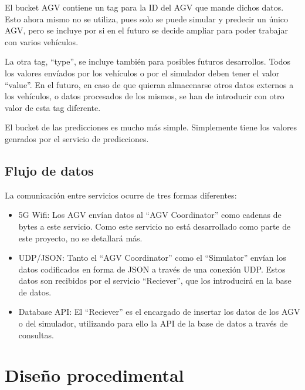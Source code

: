 El bucket AGV contiene un tag para la ID del AGV que mande dichos datos. Esto ahora mismo no se utiliza, pues 
solo se puede simular y predecir un único AGV, pero se incluye por si en el futuro se decide ampliar para poder 
trabajar con varios vehículos. 

La otra tag, ``type'', se incluye también para posibles futuros desarrollos. Todos los valores envíados por los 
vehículos o por el simulador deben tener el valor ``value''. En el futuro, en caso de que quieran almacenarse 
otros datos externos a los vehículos, o datos procesados de los mismos, se han de introducir con otro valor de 
esta tag diferente.


El bucket de las predicciones es mucho más simple. Simplemente tiene los valores genrados por el servicio de 
predicciones.

\subsection{Flujo de datos}

La comunicación entre servicios ocurre de tres formas diferentes:
\begin{itemize}
    \item 5G Wifi: Los AGV envían datos al ``AGV Coordinator'' como cadenas de bytes a este servicio.
        Como este servicio no está desarrollado como parte de este proyecto, no se detallará más.
    \item UDP/JSON: Tanto el ``AGV Coordinator'' como el ``Simulator'' envían los datos codificados en 
        forma de JSON a través de una conexión UDP. Estos datos son recibidos por el servicio ``Reciever'',
        que los introducirá en la base de datos.
    \item Database API: El ``Reciever'' es el encargado de insertar los datos de los AGV o del simulador, 
        utilizando para ello la API de la base de datos a través de consultas.
\end{itemize}

\section{Diseño procedimental}

